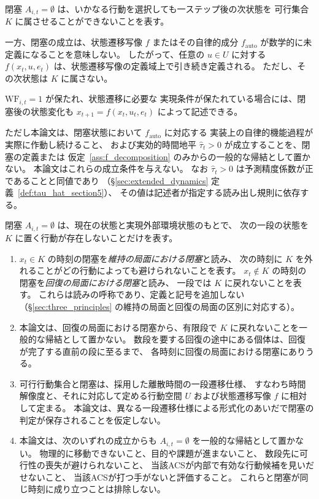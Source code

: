 \begin{remark}[閉塞と状態遷移の記述可能性]
\label{rem:blockage_auto}
閉塞
$A_{i,t}=\emptyset$
は、いかなる行動を選択しても一ステップ後の次状態を
可行集合 $K$ に属させることができないことを表す。

一方、閉塞の成立は、状態遷移写像 $f$ またはその自律的成分
$f_{\mathrm{auto}}$ が数学的に未定義になることを意味しない。
したがって、任意の $u\in U$ に対する
$f(x_t,u,e_t)$
は、状態遷移写像の定義域上で引き続き定義される。
ただし、その次状態は $K$ に属さない。

$\mathrm{WF}_{i,t}=1$ が保たれ、状態遷移に必要な
実現条件が保たれている場合には、閉塞後の状態変化も
$x_{t+1}=f(x_t,u_t,e_t)$
によって記述できる。

ただし本論文は、閉塞状態において $f_{\mathrm{auto}}$ に対応する
実装上の自律的機能過程が実際に作動し続けること、
および実効的時間地平
$\widehat{\tau}_{t}>0$
が成立することを、閉塞の定義または
仮定~\ref{ass:f_decomposition} のみからの一般的な帰結として置かない。
本論文はこれらの成立条件を与えない。
なお $\widehat{\tau}_{t}>0$ は予測精度係数が正であることと同値であり
（\S\ref{sec:extended_dynamics} 定義~\ref{def:tau_hat_section5}）、
その値は記述者が指定する読み出し規則に依存する。
\end{remark}

\begin{remark}[閉塞の意味の範囲]
\label{rem:blockage_scope_sec2}
閉塞 $A_{i,t}=\emptyset$ は、現在の状態と実現外部環境状態のもとで、
次の一段の状態を $K$ に置く行動が存在しないことだけを表す。
\begin{enumerate}[label=(\alph*)]
  \item $x_t\in K$ の時刻の閉塞を\emph{維持の局面における閉塞}と読み、
  次の時刻に $K$ を外れることがどの行動によっても避けられないことを表す。
  $x_t\notin K$ の時刻の閉塞を\emph{回復の局面における閉塞}と読み、
  一段では $K$ に戻れないことを表す。
  これらは読みの呼称であり、定義と記号を追加しない
  （\S\ref{sec:three_principles} の維持の局面と回復の局面の区別に対応する）。
  \item 本論文は、回復の局面における閉塞から、有限段で $K$ に戻れないことを一般的な帰結として置かない。
  数段を要する回復の途中にある個体は、回復が完了する直前の段に至るまで、
  各時刻に回復の局面における閉塞にありうる。
  \item 可行行動集合と閉塞は、採用した離散時間の一段遷移仕様、
  すなわち時間解像度と、それに対応して定める行動空間 $U$ および状態遷移写像 $f$ に相対して定まる。
  本論文は、異なる一段遷移仕様による形式化のあいだで閉塞の判定が保存されることを仮定しない。
  \item 本論文は、次のいずれの成立からも $A_{i,t}=\emptyset$ を一般的な帰結として置かない。
  物理的に移動できないこと、目的や課題が進まないこと、
  数段先に可行性の喪失が避けられないこと、
  当該ACSが内部で有効な行動候補を見いだせないこと、
  当該ACSが打つ手がないと評価すること。
  これらと閉塞が同じ時刻に成り立つことは排除しない。
\end{enumerate}
\end{remark}

